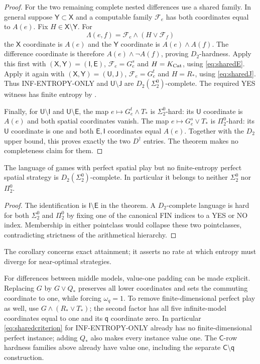 \begin{proof}
For the two remaining complete nested differences use a shared family.
In general suppose $\mathsf Y\subset\mathsf X$ and a computable
family $\mathcal F_e$ has both coordinates equal to $A(e)$. Fix
$H\in\mathsf X\setminus\mathsf Y$. For
\begin{equation}\label{eq:sharedcriterion}
 \Lambda(e,f)=\mathcal F_e\wedge(H\vee \mathcal F_f)
\end{equation}
the $\mathsf X$ coordinate is $A(e)$ and the $\mathsf Y$
coordinate is $A(e)\wedge A(f)$. The difference coordinate is
therefore $A(e)\wedge\neg A(f)$, proving $D_2$-hardness.
Apply this first with $(\mathsf X,\mathsf Y)=(\mathsf I,\mathsf E)$,
$\mathcal F_e=G^s_e$ and $H=K_{\operatorname{Cat}}$, using \eqref{eq:sharedE}.
Apply it again with $(\mathsf X,\mathsf Y)=(\mathsf U,\mathsf J)$,
$\mathcal F_e=G^t_e$ and $H=R_*$, using \eqref{eq:sharedJ}.
Thus INF-ENTROPY-ONLY and $\mathsf U\setminus\mathsf J$ are
$D_2(\Sigma^0_2)$-complete. The required YES witness has finite entropy by
\cite[Theorem 7.1]{Spatial}.

Finally, for $\mathsf U\setminus\mathsf I$ and
$\mathsf U\setminus\mathsf E$, the map $e\mapsto G^t_e\wedge T_*$
is $\Sigma^0_2$-hard: its $\mathsf U$ coordinate is $A(e)$ and
both spatial coordinates vanish. The map $e\mapsto G^s_e\vee T_*$
is $\Pi^0_2$-hard: its $\mathsf U$ coordinate is one and both
$\mathsf E,\mathsf I$ coordinates equal $A(e)$.
Together with the $D_2$ upper bound, this proves exactly the two
$D^\dagger$ entries. The theorem makes no completeness claim for them.
\end{proof}

\begin{corollary}\label{cor:entropyonly}
The language of games with perfect spatial play but no finite-entropy
perfect spatial strategy is $D_2(\Sigma^0_2)$-complete.
In particular it belongs to neither $\Sigma^0_2$ nor $\Pi^0_2$.
\end{corollary}
\begin{proof}
The identification is $\mathsf I\setminus\mathsf E$ in the theorem.
A $D_2$-complete language is hard for both $\Sigma^0_2$ and
$\Pi^0_2$ by fixing one of the canonical FIN indices to a YES or NO
index. Membership in either pointclass would collapse these two
pointclasses, contradicting strictness of the arithmetical hierarchy.
\end{proof}
The corollary concerns exact attainment; it asserts no rate at
which entropy must diverge for near-optimal strategies.

For differences between middle models, value-one padding can
be made explicit. Replacing $G$ by $G\vee Q_*$ preserves all lower
coordinates and sets the commuting coordinate to one, while forcing
$\omega_q=1$. To remove finite-dimensional perfect play as well,
use $G\wedge(R_*\vee T_*)$; the second factor has all five
infinite-model coordinates equal to one and its $\mathsf q$
coordinate zero. In particular \eqref{eq:sharedcriterion} for
INF-ENTROPY-ONLY already has no finite-dimensional perfect instance;
adding $Q_*$ also makes every instance value one.
The $\mathsf C$-row hardness families above already have value one,
including the separate $\mathsf C\setminus\mathsf q$ construction.

